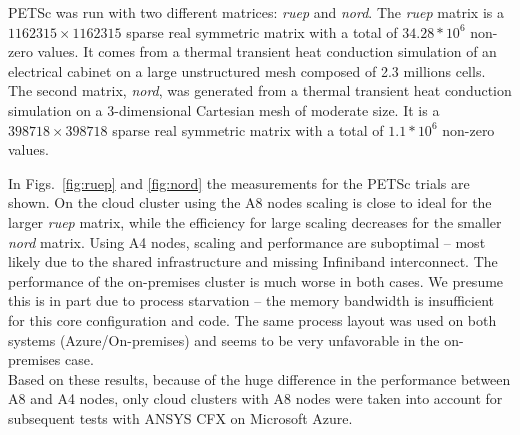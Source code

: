 \documentclass[3p,times]{elsarticle}
\begin{document}
PETSc was run with two different matrices: \textit{ruep} and \textit{nord}. The \textit{ruep} matrix is a $1162315 \times 1162315$ sparse real symmetric matrix with a total of $34.28*10^{6}$ non-zero values. It comes from a thermal transient heat conduction simulation of an electrical cabinet on a large unstructured mesh composed of 2.3 millions cells. The second matrix, \textit{nord}, was generated from a thermal transient heat conduction simulation on a 3-dimensional Cartesian mesh of moderate size. It is a $398718 \times 398718$ sparse real symmetric matrix with a total of $1.1*10^{6}$ non-zero values.

In Figs.~\ref{fig:ruep} and \ref{fig:nord} the measurements for the PETSc trials are shown. On the cloud cluster using the A8 nodes scaling is close to ideal for the larger \textit{ruep} matrix, while the efficiency for large scaling decreases for the smaller \textit{nord} matrix. Using A4 nodes, scaling and performance are suboptimal -- most likely due to the shared infrastructure and missing Infiniband interconnect.  The performance of the on-premises cluster is much worse in both cases. We presume this is in part due to process starvation -- the memory bandwidth is insufficient for this core configuration and code. The same process layout was used on both systems (Azure/On-premises) and seems to be very unfavorable in the on-premises case.\\
Based on these results, because of the huge difference in the performance between A8 and A4 nodes, only cloud clusters with A8 nodes were taken into account for subsequent tests with ANSYS CFX on Microsoft Azure.
\end{document}
